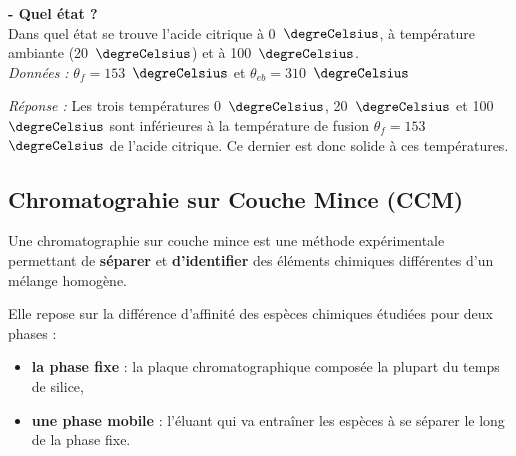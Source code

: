 \newpage

\begin{mdframed}[style=autreexo]
\textbf{ - Quel état ?}\\
Dans quel état se trouve l'acide citrique à 0~$\degreCelsius$, à température ambiante (20~$\degreCelsius$) et à 100~$\degreCelsius$.\\
\textit{Données :} $\theta_f=153$~$\degreCelsius$ et $\theta_{eb}=310$~$\degreCelsius$
\end{mdframed}
\textit{Réponse :} Les trois températures 0~$\degreCelsius$, 20~$\degreCelsius$ et 100~$\degreCelsius$ sont inférieures à la température de fusion $\theta_f=153$~$\degreCelsius$ de l'acide citrique. Ce dernier est donc solide à ces températures.

\subsection{Chromatograhie sur Couche Mince (CCM)}

\begin{tcolorbox}[colback=green!5!white,colframe=green!75!black,title=\textbf{CCM }]
Une chromatographie sur couche mince est une méthode expérimentale permettant de \textbf{séparer} et \textbf{d'identifier} des éléments chimiques différentes d'un mélange homogène.
\end{tcolorbox}
Elle repose sur la différence d'affinité des espèces chimiques étudiées pour deux phases :
\begin{itemize}
    \item \textbf{la phase fixe} : la plaque chromatographique composée la plupart du temps de silice,
    \item \textbf{une phase mobile} : l'éluant qui va entraîner les espèces à se séparer le long de la phase fixe.
\end{itemize}

